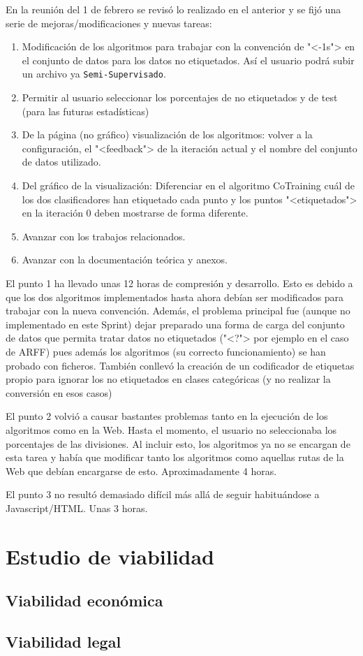 En la reunión del 1 de febrero se revisó lo realizado en el anterior y se fijó
una serie de mejoras/modificaciones y nuevas tareas:
\begin{enumerate}
    \item Modificación de los algoritmos para trabajar con la convención de
    "<-1s"> en el conjunto de datos para los datos no etiquetados. Así el
    usuario podrá subir un archivo ya \texttt{Semi-Supervisado}.
    \item Permitir al usuario seleccionar los porcentajes de no etiquetados y de
    test (para las futuras estadísticas)
    \item De la página (no gráfico) visualización de los algoritmos: volver a la configuración, el
    "<feedback"> de la iteración actual y el nombre del conjunto de datos utilizado.
    \item Del gráfico de la visualización: Diferenciar en el algoritmo
    CoTraining cuál de los dos clasificadores han etiquetado cada punto y los
    puntos "<etiquetados"> en la iteración 0 deben mostrarse de forma diferente.
    \item Avanzar con los trabajos relacionados.
    \item Avanzar con la documentación teórica y anexos.
\end{enumerate}

El punto 1 ha llevado unas 12 horas de compresión y desarrollo. Esto es debido a
que los dos algoritmos implementados hasta ahora debían ser modificados para
trabajar con la nueva convención. Además, el problema principal fue (aunque no
implementado en este Sprint) dejar preparado una forma de carga del conjunto de
datos que permita tratar datos no etiquetados ("<?"> por ejemplo en el caso de
ARFF) pues además los algoritmos (su correcto funcionamiento) se han probado con
ficheros. También conllevó la creación de un codificador de etiquetas propio
para ignorar los no etiquetados en clases categóricas (y no realizar la
conversión en esos casos)

El punto 2 volvió a causar bastantes problemas tanto en la ejecución de los
algoritmos como en la Web. Hasta el momento, el usuario no seleccionaba los
porcentajes de las divisiones. Al incluir esto, los algoritmos ya no se encargan
de esta tarea y había que modificar tanto los algoritmos como aquellas rutas de
la Web que debían encargarse de esto. Aproximadamente 4 horas.

El punto 3 no resultó demasiado difícil más allá de seguir habituándose a
Javascript/HTML. Unas 3 horas.



\section{Estudio de viabilidad}

\subsection{Viabilidad económica}

\subsection{Viabilidad legal}


